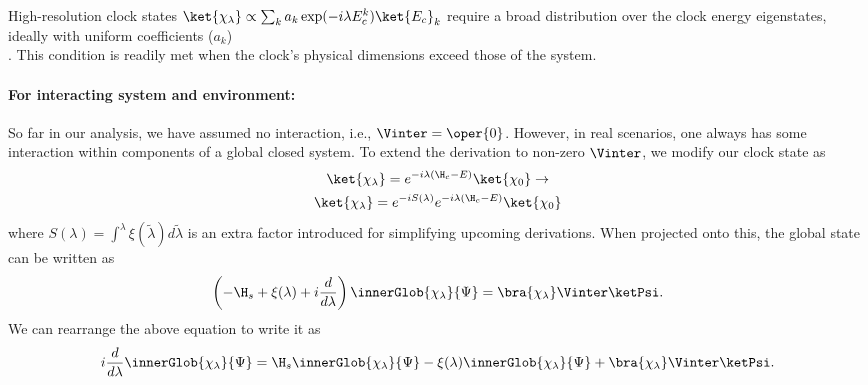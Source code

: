 High-resolution clock states $\ket{\chi_\lambda} \propto \sum_k a_k \exp (-i\lambda E_c ^k)\ket{E_c}_k$ require a broad distribution over the clock energy eigenstates, ideally with uniform coefficients ($a_k$)\\\cite{Gemsheim:2023izg, Smith:2017pwx}. This condition is readily met when the clock's physical dimensions exceed those of the system.


\paragraph{For interacting system and environment:} So far in our analysis, we have assumed 
no interaction, i.e., \(\Vinter = \oper{0}\). However, in real scenarios, one always has some
interaction within components of a global closed system. To extend the derivation to 
non-zero \(\Vinter\), we modify our clock state as
\begin{equation}
   \begin{gathered}
      \ket{\chi_\lambda} = e^{-i\lambda(\H_c - E)}\ket{\chi_0} \to \\\ket{\chi_\lambda}
       = e^{-iS(\lambda)}e^{-i\lambda(\H_c - E)}\ket{\chi_0}
   \end{gathered}
\end{equation}
where \(S(\lambda) = \int^{\lambda}\xi(\tilde{\lambda} ) d\tilde{\lambda}\) is an extra factor introduced for 
simplifying upcoming derivations. When  projected onto this, the global state can be written as
\begin{equation}
\label{eq:TISE_undecomposed}
    \left(-\H_s + \xi(\lambda) + i\dfrac{d}{d\lambda}\right) 
    \innerGlob{\chi_\lambda}{\Psi} = \bra{\chi_\lambda}\Vinter\ketPsi.
\end{equation}
We can rearrange the above equation to write it as
\begin{equation}
\label{eq:TISE_undecomposed_simp}
    \begin{gathered}
         i\dfrac{d}{d\lambda}\innerGlob{\chi_\lambda}{\Psi} =
          \H_s\innerGlob{\chi_\lambda}{\Psi} - \xi(\lambda)\innerGlob{\chi_\lambda}{\Psi}  + \bra{\chi_\lambda}\Vinter\ketPsi.
    \end{gathered}
\end{equation}

